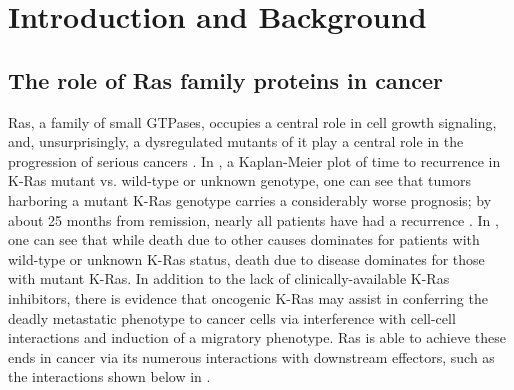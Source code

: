 \documentclass[12pt]{article}
\begin{document}
  \section*{Introduction and Background}
\subsection*{The role of Ras family proteins in cancer}	
  Ras, a family of small GTPases, occupies a central role in cell growth signaling, and, unsurprisingly, a dysregulated mutants of it play a central role in the progression of serious cancers \cite{mak2014}. In , a Kaplan-Meier plot of time to recurrence in K-Ras mutant vs. wild-type or unknown genotype, one can see that tumors harboring a mutant K-Ras genotype carries a considerably worse prognosis; by about 25 months from remission, nearly all patients have had a recurrence \cite{mak2014}. In , one can see that while death due to other causes dominates for patients with wild-type or unknown K-Ras status, death due to disease dominates for those with mutant K-Ras. In addition to the lack of clinically-available K-Ras inhibitors, there is evidence that oncogenic K-Ras may assist in conferring the deadly metastatic phenotype to cancer cells via interference with cell-cell interactions and induction of a migratory phenotype\cite{pyla}. Ras is able to achieve these ends in cancer via its numerous interactions with downstream effectors, such as the interactions shown below in . 
\end{document}
